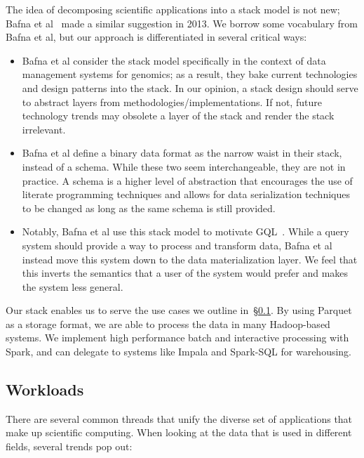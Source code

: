 \documentclass[10pt]{report} %
\begin{document}
The idea of decomposing scientific applications into a stack model is not new; Bafna et al~\cite{bafna13}
made a similar suggestion in 2013. We borrow some vocabulary from Bafna et al, but our approach is
differentiated in several critical ways:

\begin{itemize}
\item Bafna et al consider the stack model specifically in the context of data management systems for
genomics; as a result, they bake current technologies and design patterns into the stack. In our opinion,
a stack design should serve to abstract layers from methodologies/implementations. If not, future
technology trends may obsolete a layer of the stack and render the stack irrelevant.
\item Bafna et al define a binary data format as the narrow waist in their stack, instead of a schema.
While these two seem interchangeable, they are not in practice. A schema is a higher level of abstraction
that encourages the use of literate programming techniques and allows for data serialization techniques to be
changed as long as the same schema is still provided.
\item Notably, Bafna et al use this stack model to motivate GQL~\cite{kozanitis14}. While a query system
should provide a way to process and transform data, Bafna et al instead move this system down to the
data materialization layer. We feel that this inverts the semantics that a user of the system would prefer
and makes the system less general.
\end{itemize}

Our stack enables us to serve the use cases we outline in~\S\ref{sec:workloads}. By using
Parquet as a storage format, we are able to process the data in many Hadoop-based systems. We
implement high performance batch and interactive processing with Spark, and can delegate to systems
like Impala and Spark-SQL for warehousing.

\subsection{Workloads}
\label{sec:workloads}

There are several common threads that unify the diverse set of applications that make up scientific
computing. When looking at the data that is used in different fields, several trends pop out:
\end{document}
